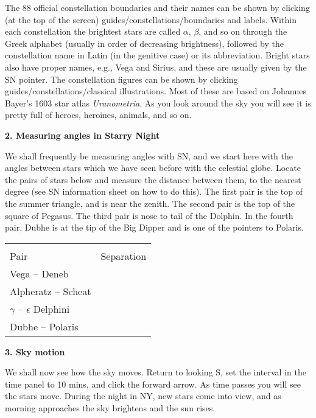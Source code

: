 \documentclass[12pt]{article}
\begin{document}
The 88 official constellation boundaries and their names can be shown
by clicking (at the top of the screen)
guides/constellations/boundaries and labels. Within each constellation
the brightest stars are called $\alpha$, $\beta$, and
so on through the Greek alphabet (usually in order of decreasing
brightness), followed by the constellation name
in Latin (in the genitive case) or its abbreviation. Bright stars also
have proper names, e.g., Vega and Sirius, and these are usually
given by the SN pointer. The constellation figures can be shown by
clicking guides/constellations/classical illustrations. Most of these
are based on Johannes Bayer's 1603 star atlas \emph{Uranometria}. As
you look around the sky you will see it is pretty full of heroes, heroines,
animals, and so on.


\bigskip
\noindent
{\bf 2. Measuring angles in Starry Night}

\medskip
\noindent
We shall frequently be measuring angles with SN, and we start here
with the angles between stars which we have seen before with the
celestial globe. Locate the pairs of stars below and measure the
distance between them, to the nearest degree (see SN information sheet
on how to do this). The first pair is the top of the summer triangle,
and is near the zenith. The second pair is the top of the square of
Pegasus. The third pair is nose to tail of the Dolphin. In the fourth
pair, Dubhe is at the tip of the Big Dipper and is one of the pointers
to Polaris.

\begin{center}
\begin{tabular}{lc} \hline \\ [-6pt]
Pair   & \hspace{1cm} Separation \hspace{1cm} \\ [6pt]
\hline
Vega -- Deneb                         &      \\ \hline
Alpheratz -- Scheat                   &      \\ \hline
$\gamma$ -- $\epsilon$ Delphini       &      \\ \hline
Dubhe -- Polaris                      &      \\ \hline
\end{tabular}
\end{center}

\newpage

\bigskip
\noindent
{\bf 3. Sky motion}

\medskip
\noindent
We shall now see how the sky moves. Return to looking S, set the
interval in the time panel to 10 mins, and click the forward arrow. As
time passes you will see the stars move. During the night in NY, new
stars come into view, and as morning approaches the sky brightens and
the sun rises.
\end{document}
